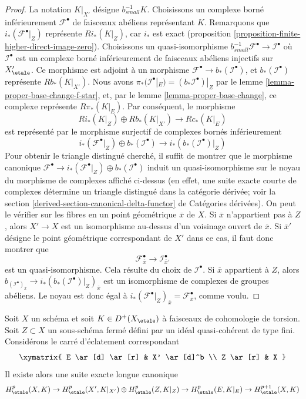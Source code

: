 \begin{proof}
La notation $K|_{X'}$ désigne $b_{small}^{-1}K$.
Choisissons un complexe borné inférieurement $\mathcal{F}^\bullet$
de faisceaux abéliens représentant $K$. Remarquons que
$i_*(\mathcal{F}^\bullet|_Z)$ représente $Ri_*(K|_Z)$,
car $i_*$ est exact
(proposition \ref{proposition-finite-higher-direct-image-zero}).
Choisissons un quasi-isomorphisme
$b_{small}^{-1}\mathcal{F}^\bullet \to \mathcal{I}^\bullet$
où $\mathcal{I}^\bullet$ est un complexe borné inférieurement de faisceaux
abéliens injectifs sur $X'_\etale$. Ce morphisme est adjoint à un morphisme
$\mathcal{F}^\bullet \to b_*(\mathcal{I}^\bullet)$, et
$b_*(\mathcal{I}^\bullet)$ représente $Rb_*(K|_{X'})$.
Nous avons $\pi_*(\mathcal{I}^\bullet|_E) = (b_*\mathcal{I}^\bullet)|_Z$
par le lemme \ref{lemma-proper-base-change-f-star}, et, par le
lemme \ref{lemma-proper-base-change}, ce complexe représente
$R\pi_*(K|_E)$. Par conséquent, le morphisme
$$
Ri_*(K|_Z) \oplus Rb_*(K|_{X'}) \to Rc_*(K|_E)
$$
est représenté par le morphisme surjectif de complexes bornés inférieurement
$$
i_*(\mathcal{F}^\bullet|_Z) \oplus
b_*(\mathcal{I}^\bullet)
\to
i_*\left(b_*(\mathcal{I}^\bullet)|_Z\right)
$$
Pour obtenir le triangle distingué cherché, il suffit de montrer que
le morphisme canonique
$\mathcal{F}^\bullet \to i_*(\mathcal{F}^\bullet|_Z) \oplus
b_*(\mathcal{I}^\bullet)$
induit un quasi-isomorphisme sur le noyau du morphisme de complexes
affiché ci-dessus (en effet, une suite exacte courte
de complexes détermine un triangle distingué dans la catégorie
dérivée; voir la
section \ref{derived-section-canonical-delta-functor} de Catégories dérivées).
On peut le vérifier sur les fibres en un point géométrique $\overline{x}$ de $X$.
Si $\overline{x}$ n'appartient pas à $Z$, alors $X' \to X$ est un isomorphisme
au-dessus d'un voisinage ouvert de $\overline{x}$. Si $\overline{x}'$
désigne le point géométrique correspondant de $X'$ dans ce cas, il
faut donc montrer que
$$
\mathcal{F}^\bullet_{\overline{x}} \to \mathcal{I}^\bullet_{\overline{x}'}
$$
est un quasi-isomorphisme. Cela résulte du choix de $\mathcal{I}^\bullet$.
Si $\overline{x}$ appartient à $Z$, alors
$b_(\mathcal{I}^\bullet)_{\overline{x}} \to 
i_*\left(b_*(\mathcal{I}^\bullet)|_Z\right)_{\overline{x}}$
est un isomorphisme de complexes de groupes abéliens. Le
noyau est donc égal à
$i_*(\mathcal{F}^\bullet|_Z)_{\overline{x}} =
\mathcal{F}^\bullet_{\overline{x}}$, comme voulu.
\end{proof}

\begin{lemma}
\label{lemma-blow-up-square-etale-cohomology}
Soit $X$ un schéma et soit $K \in D^+(X_\etale)$ à
faisceaux de cohomologie de torsion. Soit $Z \subset X$ un sous-schéma fermé
défini par un idéal quasi-cohérent de type fini. Considérons le
carré d'éclatement correspondant
$$
\xymatrix{
E \ar[d] \ar[r] & X' \ar[d]^b \\
Z \ar[r] & X
}
$$
Il existe alors une suite exacte longue canonique
$$
H^p_\etale(X, K) \to
H^p_\etale(X', K|_{X'}) \oplus
H^p_\etale(Z, K|_Z) \to
H^p_\etale(E, K|_E) \to
H^{p + 1}_\etale(X, K)
$$
\end{lemma}

